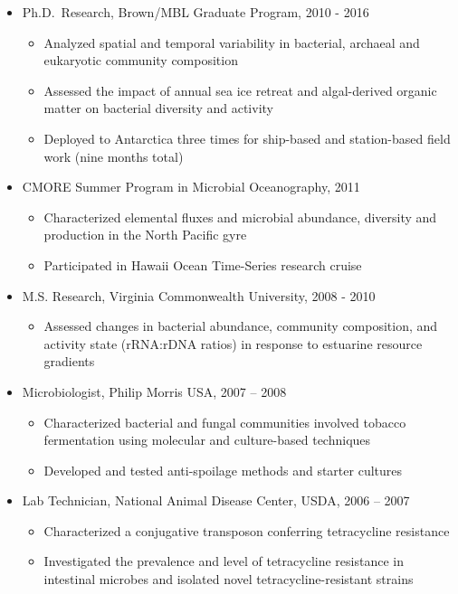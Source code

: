 \begin{itemize}
\tightlist
\item
  Ph.D.~Research, Brown/MBL Graduate Program, 2010 - 2016

  \begin{itemize}
  \tightlist
  \item
    Analyzed spatial and temporal variability in bacterial, archaeal and eukaryotic community
    composition
  \item
    Assessed the impact of annual sea ice retreat and algal-derived organic matter on bacterial diversity and activity
  \item
   Deployed to Antarctica three times for ship-based and station-based field work (nine months total)
  \end{itemize}

\item
  CMORE Summer Program in Microbial Oceanography, 2011

  \begin{itemize}
  \tightlist
  \item
    Characterized elemental fluxes and microbial abundance, diversity and production in the North Pacific gyre
      \item
    Participated in Hawaii Ocean Time-Series research cruise
  \end{itemize}
\item
  M.S. Research, Virginia Commonwealth University, 2008 - 2010

  \begin{itemize}
  \tightlist
  \item
    Assessed changes in bacterial abundance, community composition, and activity state (rRNA:rDNA ratios) in response to
    estuarine resource gradients
  \end{itemize}
\item
  Microbiologist, Philip Morris USA, 2007 -- 2008

  \begin{itemize}
  \tightlist
  \item
    Characterized bacterial and fungal communities involved tobacco fermentation using molecular 
    and culture-based techniques
  \item
    Developed and tested anti-spoilage methods and starter cultures
  \end{itemize}
\item
   Lab Technician, National Animal Disease Center,
  USDA, 2006 -- 2007

  \begin{itemize}
  \tightlist
  \item
    Characterized a conjugative transposon conferring tetracycline
    resistance
  \item
    Investigated the prevalence and level of tetracycline resistance in
    intestinal microbes and isolated novel tetracycline-resistant
    strains
  \end{itemize}
\end{itemize}

